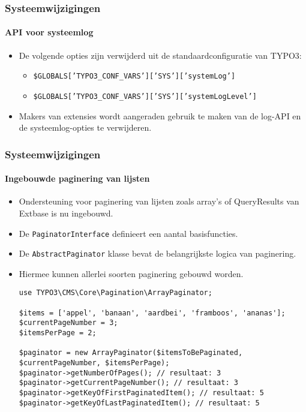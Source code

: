 
\begin{frame}[fragile]
	\frametitle{Systeemwijzigingen}
	\framesubtitle{API voor systeemlog}

	\lstset{basicstyle=\tiny\ttfamily}

	\begin{itemize}
		\item De volgende opties zijn verwijderd uit de standaardconfiguratie van TYPO3:

			\begin{itemize}\smaller
				\item \texttt{\$GLOBALS['TYPO3\_CONF\_VARS']['SYS']['systemLog']}
				\item \texttt{\$GLOBALS['TYPO3\_CONF\_VARS']['SYS']['systemLogLevel']}
			\end{itemize}\normalsize

		\item Makers van extensies wordt aangeraden gebruik te maken van de log-API en de systeemlog-opties te verwijderen.
	\end{itemize}

\end{frame}


\begin{frame}[fragile]
	\frametitle{Systeemwijzigingen}
	\framesubtitle{Ingebouwde paginering van lijsten}

	\lstset{basicstyle=\tiny\ttfamily}

	\begin{itemize}
		\item Ondersteuning voor paginering van lijsten zoals array's of QueryResults van Extbase is nu ingebouwd.
		\item De \texttt{PaginatorInterface} definieert een aantal basisfuncties.
		\item De \texttt{AbstractPaginator} klasse bevat de belangrijkste logica van paginering.
		\item Hiermee kunnen allerlei soorten paginering gebouwd worden.
\begin{lstlisting}
use TYPO3\CMS\Core\Pagination\ArrayPaginator;

$items = ['appel', 'banaan', 'aardbei', 'framboos', 'ananas'];
$currentPageNumber = 3;
$itemsPerPage = 2;

$paginator = new ArrayPaginator($itemsToBePaginated, $currentPageNumber, $itemsPerPage);
$paginator->getNumberOfPages(); // resultaat: 3
$paginator->getCurrentPageNumber(); // resultaat: 3
$paginator->getKeyOfFirstPaginatedItem(); // resultaat: 5
$paginator->getKeyOfLastPaginatedItem(); // resultaat: 5
\end{lstlisting}

	\end{itemize}

\end{frame}

